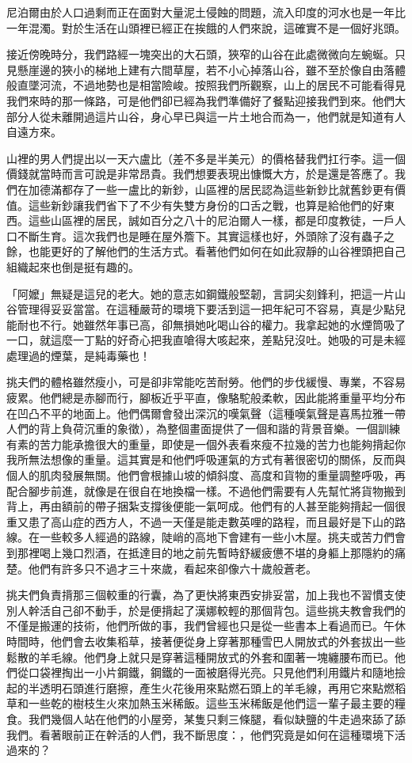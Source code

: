尼泊爾由於人口過剩而正在面對大量泥土侵蝕的問題，流入印度的河水也是一年比一年混濁。對於生活在山頭裡已經正在挨餓的人們來說，這確實不是一個好兆頭。

接近傍晚時分，我們路經一塊突出的大石頭，狹窄的山谷在此處微微向左蜿蜒。只見懸崖邊的狹小的梯地上建有六間草屋，若不小心掉落山谷，雖不至於像自由落體般直墜河流，不過地勢也是相當險峻。按照我們所觀察，山上的居民不可能看得見我們來時的那一條路，可是他們卻已經為我們準備好了餐點迎接我們到來。他們大部分人從未離開過這片山谷，身心早已與這一片土地合而為一，他們就是知道有人自遠方來。

山裡的男人們提出以一天六盧比（差不多是半美元）的價格替我們扛行李。這一個價錢就當時而言可說是非常昂貴。我們想要表現出慷慨大方，於是還是答應了。我們在加德滿都存了一些一盧比的新鈔，山區裡的居民認為這些新鈔比就舊鈔更有價值。這些新鈔讓我們省下了不少有失雙方身份的口舌之戰，也算是給他們的好東西。這些山區裡的居民，誠如百分之八十的尼泊爾人一樣，都是印度教徒，一戶人口不斷生育。這次我們也是睡在屋外簷下。其實這樣也好，外頭除了沒有蟲子之餘，也能更好的了解他們的生活方式。看著他們如何在如此寂靜的山谷裡頭把自己組織起來也倒是挺有趣的。

「阿嬤」無疑是這兒的老大。她的意志如鋼鐵般堅韌，言詞尖刻鋒利，把這一片山谷管理得妥妥當當。在這種嚴苛的環境下要活到這一把年紀可不容易，真是少點兒能耐也不行。她雖然年事已高，卻無損她叱喝山谷的權力。我拿起她的水煙筒吸了一口，就這麼一丁點的好奇心把我直嗆得大咳起來，差點兒沒吐。她吸的可是未經處理過的煙葉，是純毒藥也！

挑夫們的體格雖然瘦小，可是卻非常能吃苦耐勞。他們的步伐緩慢、專業，不容易疲累。他們總是赤腳而行，腳板近乎平直，像駱駝般柔軟，因此能將重量平均分布在凹凸不平的地面上。他們偶爾會發出深沉的嘆氣聲（這種嘆氣聲是喜馬拉雅一帶人們的背上負荷沉重的象徵），為整個畫面提供了一個和諧的背景音樂。一個訓練有素的苦力能承擔很大的重量，即使是一個外表看來瘦不拉幾的苦力也能夠揹起你我所無法想像的重量。這其實是和他們呼吸運氣的方式有著很密切的關係，反而與個人的肌肉發展無關。他們會根據山坡的傾斜度、高度和貨物的重量調整呼吸，再配合腳步前進，就像是在很自在地換檔一樣。不過他們需要有人先幫忙將貨物搬到背上，再由額前的帶子捆紮支撐後便能一氣呵成。他們有的人甚至能夠揹起一個很重又患了高山症的西方人，不過一天僅是能走數英哩的路程，而且最好是下山的路線。在一些較多人經過的路線，陡峭的高地下會建有一些小木屋。挑夫或苦力們會到那裡喝上幾口烈酒，在抵達目的地之前先暫時舒緩疲憊不堪的身軀上那隱約的痛楚。他們有許多只不過才三十來歲，看起來卻像六十歲般蒼老。

挑夫們負責揹那三個較重的行囊，為了更快將東西安排妥當，加上我也不習慣支使別人幹活自己卻不動手，於是便揹起了漢娜較輕的那個背包。這些挑夫教會我們的不僅是搬運的技術，他們所做的事，我們曾經也只是從一些書本上看過而已。午休時間時，他們會去收集稻草，接著便從身上穿著那種雪巴人開放式的外套拔出一些鬆散的羊毛線。他們身上就只是穿著這種開放式的外套和圍著一塊纏腰布而已。他們從口袋裡掏出一小片鋼鐵，鋼鐵的一面被磨得光亮。只見他們利用鐵片和隨地撿起的半透明石頭進行磨擦，產生火花後用來點燃石頭上的羊毛線，再用它來點燃稻草和一些乾的樹枝生火來加熱玉米稀飯。這些玉米稀飯是他們這一輩子最主要的糧食。我們幾個人站在他們的小屋旁，某隻只剩三條腿，看似缺鹽的牛走過來舔了舔我們。看著眼前正在幹活的人們，我不斷思度：，他們究竟是如何在這種環境下活過來的？

